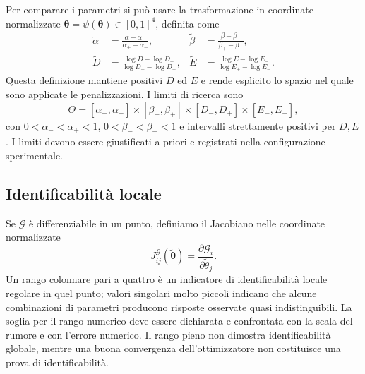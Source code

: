 Per comparare i parametri si può usare la trasformazione in coordinate normalizzate $\widetilde{\boldsymbol\theta}=\psi(\boldsymbol\theta)\in[0,1]^4$, definita come
\begin{align*}
\widetilde\alpha&=\frac{\alpha-\alpha_-}{\alpha_+-\alpha_-}, &
\widetilde\beta&=\frac{\beta-\beta_-}{\beta_+-\beta_-},\\
\widetilde D&=\frac{\log D-\log D_-}{\log D_+-\log D_-}, &
\widetilde E&=\frac{\log E-\log E_-}{\log E_+-\log E_-}.
\end{align*}
Questa definizione mantiene positivi $D$ ed $E$ e rende esplicito lo spazio nel quale sono applicate le penalizzazioni. I limiti di ricerca sono
\begin{equation}
\Theta=[\alpha_-,\alpha_+]\times[\beta_-,\beta_+]\times[D_-,D_+]\times[E_-,E_+],
\label{eq:theta-bounds}
\end{equation}
con $0<\alpha_-<\alpha_+<1$, $0<\beta_-<\beta_+<1$ e intervalli strettamente positivi per $D,E$. I limiti devono essere giustificati a priori e registrati nella configurazione sperimentale.

\subsection{Identificabilità locale}
Se $\mathcal G$ è differenziabile in un punto, definiamo il Jacobiano nelle coordinate normalizzate
\begin{equation}
J_{ij}^{\mathcal G}(\widetilde{\boldsymbol\theta})=
\frac{\partial\mathcal G_i}{\partial\widetilde\theta_j}.
\label{eq:jacobian}
\end{equation}
Un rango colonnare pari a quattro è un indicatore di identificabilità locale regolare in quel punto; valori singolari molto piccoli indicano che alcune combinazioni di parametri producono risposte osservate quasi indistinguibili. La soglia per il rango numerico deve essere dichiarata e confrontata con la scala del rumore e con l'errore numerico. Il rango pieno non dimostra identificabilità globale, mentre una buona convergenza dell'ottimizzatore non costituisce una prova di identificabilità.

